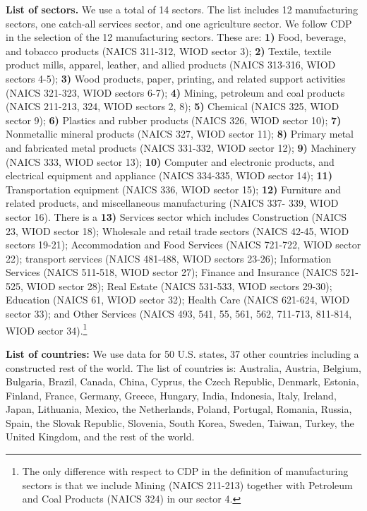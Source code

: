 \documentclass[12pt]{article}
\begin{document}
\textbf{List of sectors.} We use a total of 14 sectors. The list includes 12 manufacturing sectors, one catch-all services sector, and one agriculture sector. We follow CDP in the selection of the 12 manufacturing sectors. These are: \textbf{1)} Food, beverage, and tobacco products (NAICS 311-312, WIOD sector 3); \textbf{2)} Textile, textile product mills, apparel, leather, and allied products (NAICS 313-316, WIOD sectors 4-5); \textbf{3)} Wood products, paper, printing, and related support activities (NAICS 321-323, WIOD sectors 6-7); \textbf{4)} Mining, petroleum and coal products (NAICS 211-213, 324, WIOD sectors 2, 8); \textbf{5)} Chemical (NAICS 325, WIOD sector 9); \textbf{6)} Plastics and rubber products (NAICS 326, WIOD sector 10); \textbf{7)} Nonmetallic mineral products (NAICS 327, WIOD sector 11); \textbf{8)} Primary metal and fabricated metal products (NAICS 331-332, WIOD sector 12); \textbf{9)} Machinery (NAICS 333, WIOD sector 13); \textbf{10)} Computer and electronic products, and electrical equipment and appliance (NAICS 334-335, WIOD sector 14); \textbf{11)} Transportation equipment (NAICS 336, WIOD sector 15); \textbf{12)} Furniture and related products, and miscellaneous manufacturing (NAICS 337- 339, WIOD sector 16). There is a \textbf{13)} Services sector which includes Construction (NAICS 23, WIOD sector 18); Wholesale and retail trade sectors (NAICS 42-45, WIOD sectors 19-21); Accommodation and Food Services (NAICS 721-722, WIOD sector 22); transport services (NAICS 481-488, WIOD sectors 23-26); Information Services (NAICS 511-518, WIOD sector 27); Finance and Insurance (NAICS 521-525, WIOD sector 28); Real Estate (NAICS 531-533, WIOD sectors 29-30); Education (NAICS 61, WIOD sector 32); Health Care (NAICS 621-624, WIOD sector 33); and  Other Services (NAICS 493, 541, 55, 561, 562, 711-713, 811-814, WIOD sector 34).\footnote{The only difference with respect to CDP in the definition of manufacturing sectors is that we include Mining (NAICS 211-213) together with Petroleum and Coal Products (NAICS 324) in our sector 4.}

\textbf{List of countries:} We use data for 50 U.S. states, 37 other countries including a constructed rest of the world. The list of countries is: Australia, Austria, Belgium, Bulgaria, Brazil, Canada, China, Cyprus, the Czech Republic, Denmark, Estonia, Finland, France, Germany, Greece, Hungary, India, Indonesia, Italy, Ireland, Japan, Lithuania,
Mexico, the Netherlands, Poland, Portugal, Romania, Russia, Spain, the Slovak Republic, Slovenia, South Korea, Sweden, Taiwan, Turkey, the United Kingdom, and the rest of the world.
\end{document}
